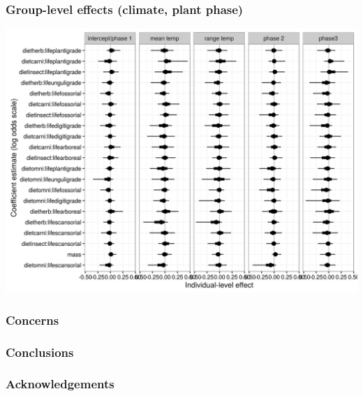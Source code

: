 \documentclass{beamer}
\begin{document}
\begin{frame}
  \frametitle{Group-level effects (climate, plant phase)}

  \begin{center}
    \includegraphics[height=0.8\textheight,width=\textwidth,keepaspectratio=true]{figure/gamma_est_full}
  \end{center}
\end{frame}

\begin{frame}
  \frametitle{Concerns}
\end{frame}

\begin{frame}
  \frametitle{Conclusions}
\end{frame}

\begin{frame}
  \frametitle{Acknowledgements}
\end{frame}
\end{document}
